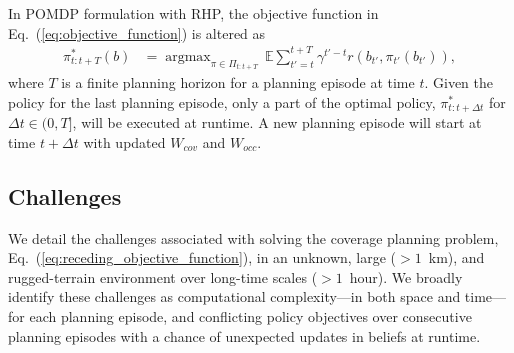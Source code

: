 \documentclass[letterpaper]{article} %
\newcommand{\phdone}[1]{} %
\newcommand{\argmax}{\mathop{\mathrm{argmax}}}
\begin{document}
\phdone{RHP Objective Function}
In POMDP formulation with RHP, the objective function in Eq.~(\ref{eq:objective_function}) is altered as
\begin{align}
  \pi_{t:t+T}^*(b) &= \argmax_{\pi \in \Pi_{t:t+T}} \, \mathbb{E} \sum_{t'=t}^{t+T} \gamma^{t'-t} r(b_{t'}, \pi_{t'}(b_{t'})),
  \label{eq:receding_objective_function}
\end{align}
where $T$ is a finite planning horizon for a planning episode at time $t$.
Given the policy for the last planning episode, only a part of the optimal policy, $\pi^*_{t:t+\Delta t}$ for $\Delta t \in (0, T]$, will be executed at runtime. A new planning episode will start at time $t+\Delta t$ with updated $W_{cov}$ and $W_{occ}$.



\subsection{Challenges} \label{ssec:challenges}

    


 
   
We detail the challenges associated with solving the coverage planning problem, Eq.~(\ref{eq:receding_objective_function}), in an unknown, large ($>\!\!1$~km), and rugged-terrain environment over long-time scales ($>\!\!1$~hour). %
We broadly identify these challenges as computational complexity---in both space and time---for each planning episode, and
conflicting policy objectives over consecutive planning episodes with a chance of unexpected updates in beliefs at runtime.
\end{document}
